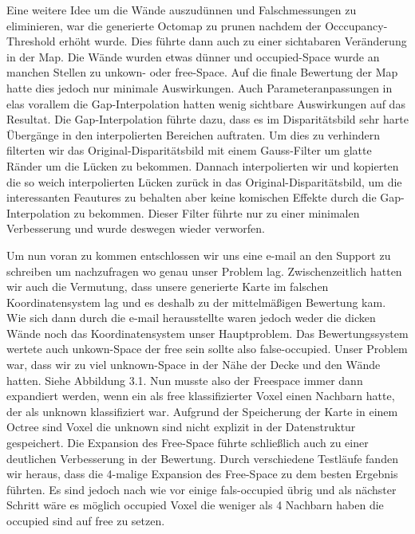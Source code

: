 \documentclass[12pt,titlepage, a4paper]{article}
\begin{document}
Eine weitere Idee um die Wände auszudünnen und Falschmessungen zu eliminieren, war die generierte Octomap zu prunen nachdem der Occcupancy-Threshold erhöht wurde. Dies führte dann auch zu einer sichtabaren Veränderung in der Map. Die Wände wurden etwas dünner und occupied-Space wurde an manchen Stellen zu unkown- oder free-Space. Auf die finale Bewertung der Map hatte dies jedoch nur minimale Auswirkungen. Auch Parameteranpassungen in elas vorallem die Gap-Interpolation hatten wenig sichtbare Auswirkungen auf das Resultat. Die Gap-Interpolation führte dazu, dass es im Disparitätsbild sehr harte Übergänge in den interpolierten Bereichen auftraten. Um dies zu verhindern filterten wir das Original-Disparitätsbild mit einem Gauss-Filter um glatte Ränder um die Lücken zu bekommen. Dannach interpolierten wir und kopierten die so weich interpolierten Lücken zurück in das Original-Disparitätsbild, um die interessanten Feautures zu behalten aber keine komischen Effekte durch die Gap-Interpolation zu bekommen. Dieser 
Filter führte nur zu einer minimalen Verbesserung und wurde deswegen wieder verworfen.

Um nun voran zu kommen entschlossen wir uns eine e-mail an den Support zu schreiben um nachzufragen wo genau unser Problem lag.
Zwischenzeitlich hatten wir auch die Vermutung, dass unsere generierte Karte im falschen Koordinatensystem lag und es deshalb zu der mittelmäßigen Bewertung kam.
Wie sich dann durch die e-mail herausstellte waren jedoch weder die dicken Wände noch das Koordinatensystem unser Hauptproblem. Das Bewertungssystem wertete auch unkown-Space der free sein sollte also false-occupied. Unser Problem war, dass wir zu viel unknown-Space in der Nähe der Decke und den Wände hatten. Siehe Abbildung 3.1.
Nun musste also der Freespace immer dann expandiert werden, wenn ein als free klassifizierter Voxel einen Nachbarn hatte, der als unknown klassifiziert war. Aufgrund der Speicherung der Karte in einem Octree sind Voxel die unknown sind nicht explizit in der Datenstruktur gespeichert. Die Expansion des Free-Space führte schließlich auch zu einer deutlichen Verbesserung in der Bewertung. Durch verschiedene Testläufe fanden wir heraus, dass die 4-malige Expansion des Free-Space zu dem besten Ergebnis führten. Es sind jedoch nach wie vor einige fals-occupied übrig und als nächster Schritt wäre es möglich occupied Voxel die weniger als 4 Nachbarn haben die occupied sind auf free zu setzen.
\end{document}
